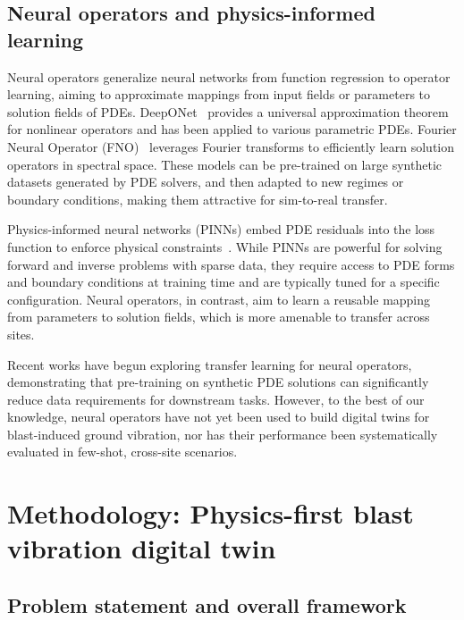 \documentclass[a4paper,fleqn]{cas-sc}
\begin{document}
\subsection{Neural operators and physics-informed learning}

Neural operators generalize neural networks from function regression to operator learning,
aiming to approximate mappings from input fields or parameters to solution fields of PDEs.
DeepONet~\citep{Lu2021DeepONet} provides a universal approximation theorem for nonlinear operators
and has been applied to various parametric PDEs.
Fourier Neural Operator (FNO)~\citep{Li2021FNO} leverages Fourier transforms
to efficiently learn solution operators in spectral space.
These models can be pre-trained on large synthetic datasets generated by PDE solvers,
and then adapted to new regimes or boundary conditions,
making them attractive for sim-to-real transfer.

Physics-informed neural networks (PINNs) embed PDE residuals into the loss function
to enforce physical constraints~\citep{Raissi2019PINN}.
While PINNs are powerful for solving forward and inverse problems with sparse data,
they require access to PDE forms and boundary conditions at training time
and are typically tuned for a specific configuration.
Neural operators, in contrast, aim to learn a reusable mapping
from parameters to solution fields, which is more amenable to transfer across sites.

Recent works have begun exploring transfer learning for neural operators,
demonstrating that pre-training on synthetic PDE solutions can significantly reduce data requirements
for downstream tasks.
However, to the best of our knowledge, neural operators have not yet been used
to build digital twins for blast-induced ground vibration,
nor has their performance been systematically evaluated in few-shot, cross-site scenarios.

\section{Methodology: Physics-first blast vibration digital twin}
\label{sec:method}

\subsection{Problem statement and overall framework}
\end{document}
